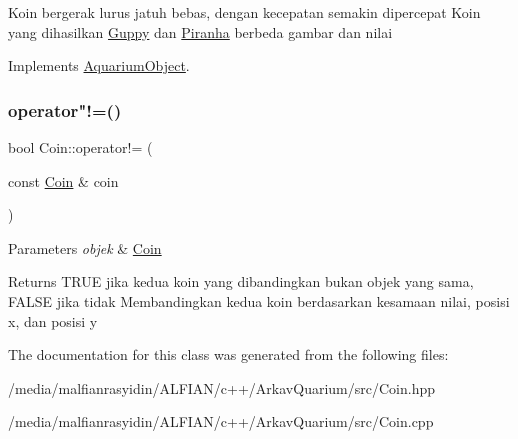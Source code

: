 Koin bergerak lurus jatuh bebas, dengan kecepatan semakin dipercepat Koin yang dihasilkan \mbox{\hyperlink{class_guppy}{Guppy}} dan \mbox{\hyperlink{class_piranha}{Piranha}} berbeda gambar dan nilai 

Implements \mbox{\hyperlink{class_aquarium_object_a42c4de640f89ac8aebc26b7618578575}{Aquarium\+Object}}.

\mbox{\label{class_coin_a551d7fe1d719474f0e4cbf5930d09a78}} 
\subsubsection{\texorpdfstring{operator"!=()}{operator!=()}}
{\footnotesize\ttfamily bool Coin\+::operator!= (\begin{DoxyParamCaption}\item[{const \mbox{\hyperlink{class_coin}{Coin}} \&}]{coin }\end{DoxyParamCaption})}


\begin{DoxyParams}{Parameters}
{\em objek} & \mbox{\hyperlink{class_coin}{Coin}} \\
\hline
\end{DoxyParams}
\begin{DoxyReturn}{Returns}
T\+R\+UE jika kedua koin yang dibandingkan bukan objek yang sama, F\+A\+L\+SE jika tidak Membandingkan kedua koin berdasarkan kesamaan nilai, posisi x, dan posisi y 
\end{DoxyReturn}


The documentation for this class was generated from the following files\+:\begin{DoxyCompactItemize}
\item 
/media/malfianrasyidin/\+A\+L\+F\+I\+A\+N/c++/\+Arkav\+Quarium/src/Coin.\+hpp\item 
/media/malfianrasyidin/\+A\+L\+F\+I\+A\+N/c++/\+Arkav\+Quarium/src/Coin.\+cpp\end{DoxyCompactItemize}
